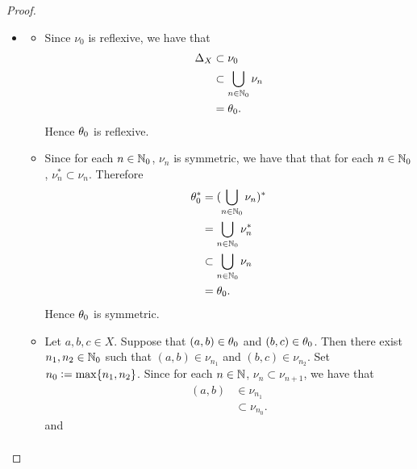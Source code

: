 \begin{proof}
\begin{enumerate}
\begin{itemize}
\begin{itemize}
				\item {} \\
				Let $n \in \N_0$. Suppose that $\nu_n \subset \ep(\nu)$. Then 
				\begin{align*}
					\nu_{n+1}
					& = \nu_n \circ \nu_n \\
					& \subset \ep(\nu) \circ \ep(\nu) \\
					& = \ep(\nu).
				\end{align*}
			\end{itemize}
			By induction, for each $n \in \N_0$, $\nu_n \subset \ep(\nu)$. Therefore 
			\begin{align*}
				\th_0 
				& = \bigcup\limits_{n \in \N_0} \nu_n \\
				& \subset \ep(\nu).
			\end{align*}
			\item 
			\begin{itemize}
				\item Since $\nu_0$ is reflexive, we have that 
				\begin{align*}
					\Delta_X 
					& \subset \nu_0 \\
					& \subset \bigcup\limits_{n \in \mathbb{N}_0} \nu_n \\
					& = \theta_0.  
				\end{align*}
				Hence $\theta_0$ is reflexive.
				\item Since for each $n \in \N_0$, $\nu_n$ is symmetric, we have that that  for each $n \in \N_0$, $\nu_n^* \subset \nu_n$. Therefore 
				\begin{align*}
					\theta_0^*
					& = (\bigcup\limits_{n \in \mathbb{N}_0} \nu_n)^* \\
					& = \bigcup\limits_{n \in \mathbb{N}_0} \nu_n^* \\
					& \subset \bigcup\limits_{n \in \mathbb{N}_0} \nu_n \\
					& = \theta_0.
				\end{align*}
				Hence $\theta_0$ is symmetric. 
				\item Let $a,b,c \in X$. Suppose that $(a,b) \in \theta_0$ and $(b,c) \in \theta_0$. Then there exist $n_1, n_2 \in \mathbb{N}_0$ such that $(a,b) \in \nu_{n_1}$ and $(b,c) \in \nu_{n_2}$. Set $n_0 \vcentcolon= \max\{n_1, n_2\}$. Since for each $n \in \mathbb{N}$, $\nu_n \subset \nu_{n+1}$, we have that 
				\begin{align*}
					(a,b)
					& \in \nu_{n_1} \\
					& \subset \nu_{n_0}.
				\end{align*}
				and 
				\begin{align*}

\end{align*}
\end{itemize}
\end{itemize}
\end{enumerate}
\end{proof}
